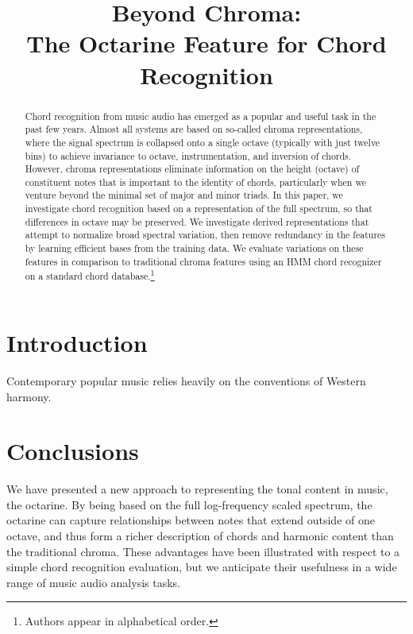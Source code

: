 \documentclass{article}
\title{Beyond Chroma: \\The Octarine Feature for Chord Recognition}
\begin{document}
%
\maketitle
%
\begin{abstract}
Chord recognition from music audio has emerged as a popular and useful task in 
the past few years.  Almost all systems are based on so-called chroma representations, 
where the signal spectrum is collapsed onto a single octave (typically with just twelve 
bins) to achieve invariance to octave, instrumentation, and inversion of chords.  However, 
chroma representations eliminate information on the height (octave) of constituent notes 
that is important to the identity of chords, particularly when we venture beyond the 
minimal set of major and minor triads.  In this paper, we investigate chord recognition based 
on a representation of the full spectrum, so that differences in octave may be preserved.  
We investigate derived representations that attempt to normalize broad spectral variation, then 
remove redundancy in the features by learning efficient bases from the training data.  We 
evaluate variations on these features in comparison to traditional chroma features using an 
HMM chord recognizer on a standard chord database.\footnote{Authors appear in alphabetical order.}

\end{abstract}
%
\section{Introduction}\label{sec:introduction}
Contemporary popular music relies heavily on the conventions of Western harmony.  

\section{Conclusions}\label{sec:conclus}

We have presented a new approach to representing the tonal content in music, 
the octarine.  By being based on the full log-frequency scaled spectrum, the 
octarine can capture relationships between notes that extend outside of one 
octave, and thus form a richer description of chords and harmonic content than 
the traditional chroma.  These advantages have been illustrated with respect to 
a simple chord recognition evaluation, but we anticipate their usefulness in a wide 
range of music audio analysis tasks.


\end{document}
